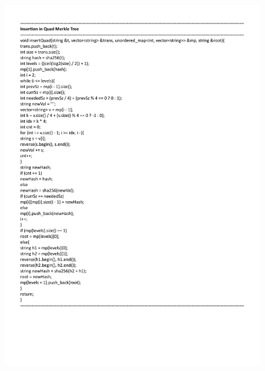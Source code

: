 
\begin{figure}[H]
    \centering
    \includegraphics[scale=0.65]{figures/quad insert.pdf}
 
\end{figure}

 

